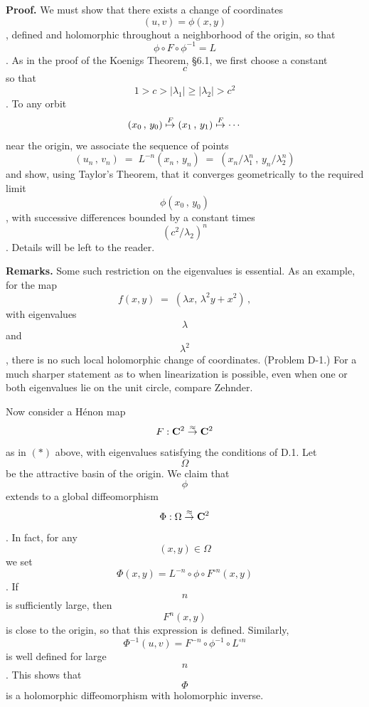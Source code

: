 {\bf Proof.} We must show that there exists a change of coordinates \[(u,v)=\phi(x,y)\],
defined and holomorphic throughout a neighborhood of the origin,
so that \[\phi\circ F\circ\phi^{-1}=L\]. As in the proof of the Ko$\!$enigs
Theorem, \S6.1, we first choose a constant \[c\] so that\break
\[1>c>|\lambda_1|\ge|\lambda_2|>c^2\]. To any orbit
$$	(x_0\,,\,y_0)\buildrel F\over\mapsto(x_1\,,\,y_1)
	\buildrel F\over\mapsto\cdots	$$
near the origin, we associate the sequence of points
$$	(u_n\,,\,v_n)\;=\;L^{-n}(x_n\,,\,y_n)\;=\;(x_n/\lambda_1^n\,,\,y_n
	/\lambda_2^n)	$$
and show, using Taylor's Theorem, that it converges geometrically to the
required limit \[\phi(x_0\,,\,y_0)\], with
successive differences bounded by a constant times \[(c^2/\lambda_2)^n\].
Details will be left to the reader.\QED

{\bf Remarks.} Some such restriction on the eigenvalues is essential.
As an example, for the map
$$	f(x,y)\;=\;(\lambda x,\,\lambda^2 y+x^2)\,,	$$
with eigenvalues \[\lambda\] and \[\lambda^2\],
there is no such local holomorphic change of coordinates. (Problem D-1.)
For a much sharper statement as to when linearization is possible,
even when one or both eigenvalues lie on the unit circle, compare Zehnder.


\smallskip

Now consider a H\'enon map \[F:\C^2\buildrel \approx\over\to\C^2\] as
in $(*)$ above,
with eigenvalues satisfying the conditions of D.1. Let \[\Omega\] be the
attractive basin of the origin. We claim that \[\phi\] extends
to a global diffeomorphism \[\Phi:\Omega\buildrel \approx\over\to\C^2\].
In fact, for any \[(x,y)\in\Omega\] we set \[\Phi(x,y)=L^{-n}\circ\phi\circ
F^{\circ n}(x,y)\]. If \[n\] is sufficiently large, then \[F^n(x,y)\] is
close to the origin, so that this expression is defined. Similarly,
\[\Phi^{-1}(u,v)=F^{-n}\circ\phi^{-1}\circ L^{\circ n}\] is well defined
for large \[n\]. This shows that
\[\Phi\] is a holomorphic diffeomorphism with holomorphic inverse.\smallskip



